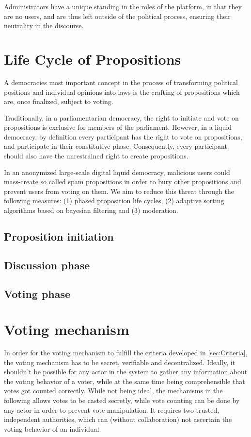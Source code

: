 Administrators have a unique standing in the roles of the platform, in that they are no users, and are thus left outside of the political process, ensuring their neutrality in the discourse.

\section{Life Cycle of Propositions}
\label{sec:Model_Propositions}
A democracies most important concept in the process of transforming political positions and individual opinions into laws is the crafting of propositions which are, once finalized, subject to voting.

Traditionally, in a parliamentarian democracy, the right to initiate and vote on propositions is exclusive for members of the parliament.
However, in a liquid democracy, by definition every participant has the right to vote on propositions, and participate in their constitutive phase. Consequently, every participant should also have the unrestrained right to create propositions.

In an anonymized large-scale digital liquid democracy, malicious users could mass-create so called spam propositions in order to bury other propositions and prevent users from voting on them.
We aim to reduce this threat through the following measures: (1) phased proposition life cycles, (2) adaptive sorting algorithms based on bayesian filtering and (3) moderation.

\subsection{Proposition initiation}
\label{ssec:Lifecycle_Initiation}

\subsection{Discussion phase}
\label{ssec:Lifecycle_Discussion}

\subsection{Voting phase}
\label{ssec:Lifecycle_Voting}

\section{Voting mechanism}
\label{sec:Voting_Mechanism}
In order for the voting mechanism to fulfill the criteria developed in \ref{sec:Criteria}, the voting mechanism has to be secret, verifiable and decentralized. Ideally, it shouldn't be possible for any actor in the system to gather any information about the voting behavior of a voter, while at the same time being comprehensible that votes got counted correctly. While not being ideal, the mechanisms in the following allows votes to be casted secretly, while vote counting can be done by any actor in order to prevent vote manipulation. It requires two trusted, independent authorities, which can (without collaboration) not ascertain the voting behavior of an individual.

